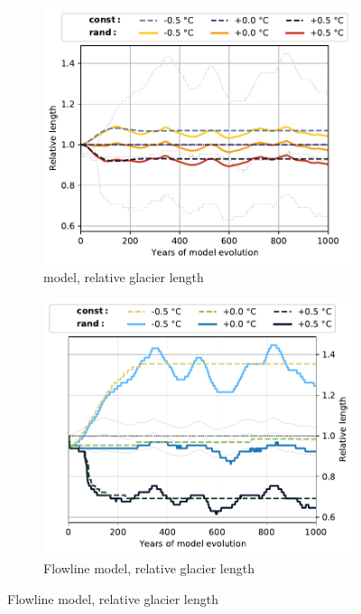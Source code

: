 \begin{figure}[p]
  \begin{subfigure}[b]{0.476\textwidth}
    \caption{\Vas{} model, relative glacier length}
    \label{fig:Pasterze:length_vas}
    \centering
    \includegraphics[width=\textwidth]{../plots/final_plots/time_series/single_glaciers/length_norm_vas_Pasterze.pdf}
  \end{subfigure}
  \hfill
  \begin{subfigure}[b]{0.476\textwidth}
    \caption{Flowline model, relative glacier length}
    \label{fig:Pasterze:length_fl}
    \centering
    \includegraphics[width=\textwidth]{../plots/final_plots/time_series/single_glaciers/length_norm_fl_Pasterze.pdf}
  \end{subfigure}
  

\end{figure}
